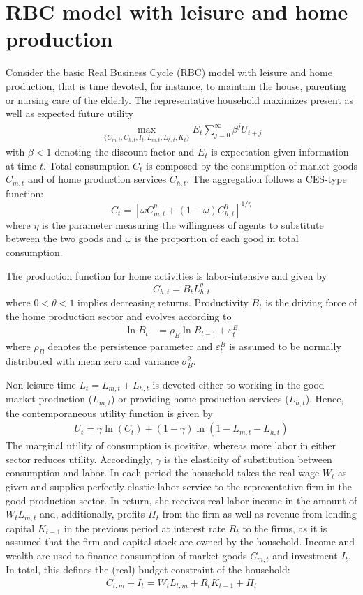 \documentclass[a4paper]{scrartcl}
\begin{document}
    \section{RBC model with leisure and home production}
    Consider the basic Real Business Cycle (RBC) model with leisure and home production, that is time devoted, for instance, to maintain the house, parenting or nursing care of the elderly. The representative household maximizes present as well as expected future utility
    \begin{align*}
        \underset{\{C_{m,t},C_{h,t},I_{t},L_{m,t},L_{h,t},K_{t}\}}{\max} E_t \sum_{j=0}^{\infty} \beta^{j} U_{t+j}
    \end{align*}
    with $\beta <1$ denoting the discount factor and $E_t$ is expectation given information at time $t$. Total consumption $C_t$ is composed by the consumption of market goods $C_{m,t}$ and of home production services $C_{h,t}$. The aggregation follows a CES-type function:
    $$C_t = \left[\omega C_{m,t}^\eta +(1-\omega)C_{h,t}^\eta\right]^{1/\eta}$$
    where $\eta$ is the parameter measuring the willingness of agents to substitute between the two goods and $\omega$ is the proportion of each good in total consumption. 
    
    The production function for home activities is labor-intensive and given by
    $$C_{h,t}=B_t L_{h,t}^\theta$$
    where $0<\theta<1$ implies decreasing returns. Productivity $B_t$ is the driving force of the home production sector and evolves according to
    \begin{align*}
        \ln{B_{t}} & = \rho_B \ln{B_{t-1}}  + \varepsilon_t^B
    \end{align*}
    where $\rho_B$ denotes the persistence parameter and $\varepsilon_t^B$ is assumed to be normally distributed with mean zero and variance $\sigma_B^2$.
    
    Non-leisure time $L_t=L_{m,t}+L_{h,t}$ is devoted either to working in the good market production ($L_{m,t}$) or providing home production services ($L_{h,t}$). Hence, the contemporaneous utility function is given by
    \begin{align*}
        U_t = \gamma \ln(C_t) + (1-\gamma) \ln{(1-L_{m,t}-L_{h,t})}
    \end{align*}
    The marginal utility of consumption is positive, whereas more labor in either sector reduces utility. Accordingly, $\gamma$ is the elasticity of substitution between consumption and labor. In each period the household takes the real wage $W_t$ as given and supplies perfectly elastic labor service to the representative firm in the good production sector. In return, she receives real labor income in the amount of $W_t L_{m,t}$ and, additionally, profits $\Pi_t$ from the firm as well as revenue from lending capital $K_{t-1}$ in the previous period at interest rate $R_t$ to the firms, as it is assumed that the firm and capital stock are owned by the household. Income and wealth are used to finance consumption of market goods $C_{m,t}$ and investment $I_t$. In total, this defines the (real) budget constraint of the household:
    \begin{align*}
        C_{t,m} + I_t = W_t L_{t,m} + R_t K_{t-1} + \Pi_t
    \end{align*}
    
\end{document}

